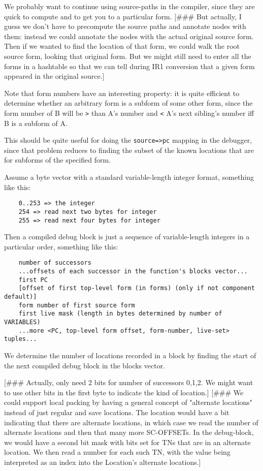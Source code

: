 We probably want to continue using source-paths in the compiler, since they are
quick to compute and to get you to a particular form.  [\#\#\# But actually, I
guess we don't have to precompute the source paths and annotate nodes with
them: instead we could annotate the nodes with the actual original source form.
Then if we wanted to find the location of that form, we could walk the root
source form, looking that original form.  But we might still need to enter all
the forms in a hashtable so that we can tell during IR1 conversion that a given
form appeared in the original source.]


Note that form numbers have an interesting property: it is quite efficient to
determine whether an arbitrary form is a subform of some other form, since the
form number of B will be \verb+>+ than A's number and \verb+<+ A's next sibling's number iff
B is a subform of A.  

This should be quite useful for doing the \verb|source=>pc| mapping in the debugger,
since that problem reduces to finding the subset of the known locations that
are for subforms of the specified form.


Assume a byte vector with a standard variable-length integer format, something
like this:

\begin{verbatim}
    0..253 => the integer
    254 => read next two bytes for integer
    255 => read next four bytes for integer
\end{verbatim}

Then a compiled debug block is just a sequence of variable-length integers in a
particular order, something like this:

\begin{verbatim}
    number of successors
    ...offsets of each successor in the function's blocks vector...
    first PC
    [offset of first top-level form (in forms) (only if not component default)]
    form number of first source form
    first live mask (length in bytes determined by number of VARIABLES)
    ...more <PC, top-level form offset, form-number, live-set> tuples...
\end{verbatim}

We determine the number of locations recorded in a block by finding the
start of the next compiled debug block in the blocks vector.

[\#\#\# Actually, only need 2 bits for number of successors {0,1,2}.  We might
want to use other bits in the first byte to indicate the kind of location.]
[\#\#\# We could support local packing by having a general concept of "alternate
locations" instead of just regular and save locations.  The location would have
a bit indicating that there are alternate locations, in which case we read the
number of alternate locations and then that many more SC-OFFSETs.  In the
debug-block, we would have a second bit mask with bits set for TNs that are in
an alternate location.  We then read a number for each such TN, with the value
being interpreted as an index into the Location's alternate locations.]



